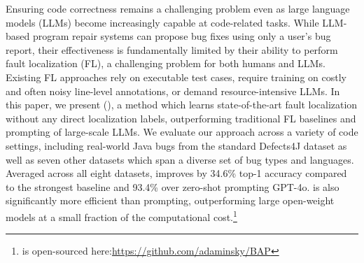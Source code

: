 


Ensuring code correctness remains a challenging problem even
as large language models (LLMs) become increasingly capable at code-related tasks. While LLM-based program repair systems can propose bug fixes using only a user's bug report, their effectiveness is fundamentally limited by their ability to perform fault localization (FL), a challenging problem for both humans and LLMs.
Existing FL approaches rely on executable test cases, require training on costly and often noisy line-level annotations, or demand resource-intensive LLMs.
In this paper, we present \textit{\ourmethodlong{}} (\ourmethod{}), a method which learns state-of-the-art fault localization without any direct localization labels, outperforming traditional FL baselines and prompting of large-scale LLMs.
We evaluate our approach across a variety of code settings, including real-world Java bugs from the standard Defects4J dataset as well as seven other datasets which span a diverse set of bug types and languages. Averaged across all eight datasets, 
\ourmethod{} improves by 34.6\% top-1 accuracy
compared to the strongest baseline and 93.4\% over zero-shot prompting GPT-4o. \ourmethod{} is also significantly more efficient than prompting, outperforming large open-weight models at a small fraction of the computational cost.\footnote{\ourmethod{} is open-sourced here:\newline \url{https://github.com/adaminsky/BAP}}

